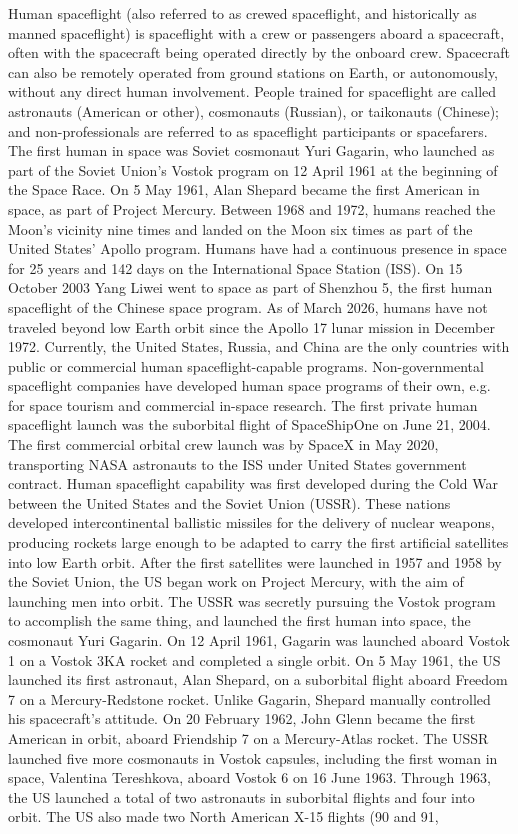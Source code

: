 \documentclass[12pt]{article}
\begin{document}
Human spaceflight (also referred to as crewed spaceflight, and historically as manned spaceflight) is spaceflight with a crew or passengers aboard a spacecraft, often with the spacecraft being operated directly by the onboard crew. Spacecraft can also be remotely operated from ground stations on Earth, or autonomously, without any direct human involvement. People trained for spaceflight are called astronauts (American or other), cosmonauts (Russian), or taikonauts (Chinese); and non-professionals are referred to as spaceflight participants or spacefarers. The first human in space was Soviet cosmonaut Yuri Gagarin, who launched as part of the Soviet Union's Vostok program on 12 April 1961 at the beginning of the Space Race. On 5 May 1961, Alan Shepard became the first American in space, as part of Project Mercury. Between 1968 and 1972, humans reached the Moon's vicinity nine times and landed on the Moon six times as part of the United States' Apollo program. Humans have had a continuous presence in space for 25 years and 142 days on the International Space Station (ISS). On 15 October 2003 Yang Liwei went to space as part of Shenzhou 5, the first human spaceflight of the Chinese space program. As of March 2026, humans have not traveled beyond low Earth orbit since the Apollo 17 lunar mission in December 1972. Currently, the United States, Russia, and China are the only countries with public or commercial human spaceflight-capable programs. Non-governmental spaceflight companies have developed human space programs of their own, e.g. for space tourism and commercial in-space research. The first private human spaceflight launch was the suborbital flight of SpaceShipOne on June 21, 2004. The first commercial orbital crew launch was by SpaceX in May 2020, transporting NASA astronauts to the ISS under United States government contract. Human spaceflight capability was first developed during the Cold War between the United States and the Soviet Union (USSR). These nations developed intercontinental ballistic missiles for the delivery of nuclear weapons, producing rockets large enough to be adapted to carry the first artificial satellites into low Earth orbit. After the first satellites were launched in 1957 and 1958 by the Soviet Union, the US began work on Project Mercury, with the aim of launching men into orbit. The USSR was secretly pursuing the Vostok program to accomplish the same thing, and launched the first human into space, the cosmonaut Yuri Gagarin. On 12 April 1961, Gagarin was launched aboard Vostok 1 on a Vostok 3KA rocket and completed a single orbit. On 5 May 1961, the US launched its first astronaut, Alan Shepard, on a suborbital flight aboard Freedom 7 on a Mercury-Redstone rocket. Unlike Gagarin, Shepard manually controlled his spacecraft's attitude. On 20 February 1962, John Glenn became the first American in orbit, aboard Friendship 7 on a Mercury-Atlas rocket. The USSR launched five more cosmonauts in Vostok capsules, including the first woman in space, Valentina Tereshkova, aboard Vostok 6 on 16 June 1963. Through 1963, the US launched a total of two astronauts in suborbital flights and four into orbit. The US also made two North American X-15 flights (90 and 91, 
\end{document}
